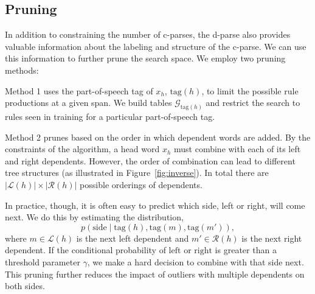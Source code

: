 \documentclass[11pt,letterpaper]{article}
\newcommand{\rules}{\mathcal{G}}
\newcommand{\LeftS}{\mathcal{L} }
\newcommand{\RightS}{\mathcal{R} }
\newcommand{\TagFN}[1]{\mathrm{tag}({#1})}
\newcommand{\nascomment}[1]{\textcolor{blue}{\bf \small [#1 --nas]}}
\begin{document}


\subsection{Pruning}
\label{sec:prune}

In addition to constraining the number of c-parses, 
the d-parse also provides valuable information about the labeling 
and structure of the c-parse. We can use this information to 
further prune the search space. We employ two pruning methods:

Method 1 uses the part-of-speech tag of $x_h$, $\TagFN{h}$, to
limit the possible rule productions at a given span. We
build tables $\rules_{\TagFN{h}}$ and restrict the search to rules
seen in training for a particular part-of-speech tag. 

Method 2 prunes based on the order in which dependent words are added.
By the constraints of the algorithm, a head word $x_h$ must combine
with each of its left and right dependents. However, the order of
combination can lead to different tree structures (as illustrated in
Figure~\ref{fig:inverse}). In total there are 
$|\LeftS(h)| \times |\RightS(h)|$ possible orderings of dependents. 

In practice, though, it is often easy to predict which side, left or
right, will come next. We do this by estimating the distribution,
\[  p(\textrm{side} \mid \TagFN{h}, \TagFN{m},
\TagFN{m'}), \]
where $m \in \LeftS(h)$ is the next left dependent and $m' \in \RightS(h)$ is the next right
dependent. If the conditional probability of $\mathrm{left}$ or
$\mathrm{right}$ is greater than a threshold parameter $\gamma$,
we make a hard decision to combine with that side next. This pruning
further reduces the impact of outliers with multiple dependents on both sides.
\end{document}
